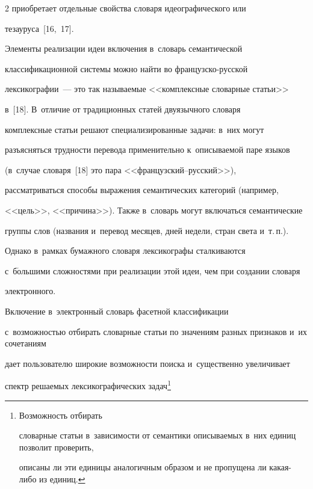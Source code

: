 \begin{multicols}{2}
приобретает отдельные свойства словаря идеографического или 


тезауруса~[16,~17].


{





}


  


  Элементы реализации идеи включения в~словарь семантической 


классификационной системы можно найти во фран\-цуз\-ско-рус\-ской 


лексикографии~--- это так называемые <<комплексные словарные статьи>> 


в~[18]. В~отличие от традиционных статей двуязычного словаря 


комплексные статьи решают специализированные задачи: в~них могут 


разъясняться трудности перевода применительно к~описываемой паре языков 


(в~случае словаря~[18] это пара <<фран\-цуз\-ский--рус\-ский>>), 


рассматриваться способы выражения семантических категорий (например, 


<<цель>>, <<причина>>). Также в~словарь могут включаться семантические 


группы слов (названия и~перевод месяцев, дней недели, стран света и~т.\,п.). 


Однако в~рамках бумажного словаря лексикографы сталкиваются 


с~б$\acute{\mbox{о}}$льшими сложностями при реализации этой идеи, чем при создании словаря 


электронного.


  


  Включение в~электронный словарь фасетной классификации 


с~возможностью отбирать словарные статьи по значениям разных признаков и~их сочетаниям 


дает пользователю широкие возможности поиска и~существенно увеличивает 


спектр решаемых лексикографических задач\footnote[1]{Возможность отбирать 


словарные статьи в~зависимости от семантики описываемых в~них единиц позволит проверить, 


описаны ли эти единицы аналогичным образом и не пропущена ли ка\-кая-ли\-бо из единиц. 


}
\end{multicols}
